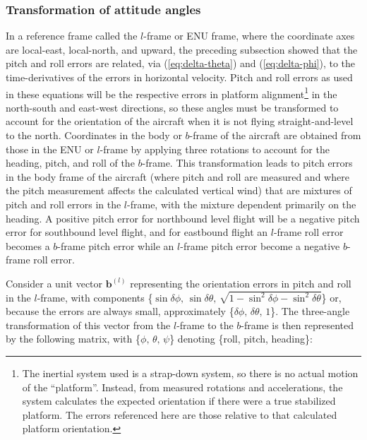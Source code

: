 \documentclass[12pt,twoside,english]{article}\usepackage[]{graphicx}\usepackage[]{color}
\let\OrgIndex\index
\renewcommand*{\index}[1]{\OrgIndex{#1}}
\begin{document}
\subsubsection{Transformation of attitude angles\label{sub:angle-transforms-for-pitch-correction}}

In a reference frame called the $l$-frame or ENU frame, where the coordinate axes are local-east, local-north, and upward, the preceding subsection showed that the pitch and roll errors are related, via (\ref{eq:delta-theta}) and (\ref{eq:delta-phi}), to the time-derivatives of the errors in horizontal velocity. Pitch and roll errors as used in these equations will be the respective errors in platform alignment\footnote{The inertial system used is a strap-down system, so there is no actual motion of the ``platform''. Instead, from measured rotations and accelerations, the system calculates the expected orientation if there were a true stabilized platform. The errors referenced here are those relative to that calculated platform orientation.} in the north-south and east-west directions, so these angles must be transformed to account for the orientation of the aircraft when it is not flying straight-and-level to the north. Coordinates in the body or $b$-frame of the aircraft are obtained from those in the ENU or $l$-frame by applying three rotations to account for the heading, pitch, and roll of the $b$-frame. This transformation leads to pitch errors in the body frame of the aircraft (where pitch and roll are measured and where the pitch measurement affects the calculated vertical wind) that are mixtures of pitch and roll errors in the $l$-frame, with the mixture dependent primarily on the heading. A positive pitch error for northbound level flight will be a negative pitch error for southbound level flight, and for eastbound flight an $l$-frame roll error becomes a $b$-frame pitch error while an $l$-frame pitch error become a negative $b$-frame roll error. 

Consider a unit vector $\mathbf{b}^{(l)}$ representing the orientation errors in pitch and roll in the $l$-frame, with components \{$\sin\delta\phi,\,\sin\delta\theta,\,\sqrt{1-\sin^{2}\delta\phi-\sin^{2}\delta\theta}$\} or, because the errors are always small, approximately \{$\delta\phi,\,\delta\theta,\,1$\}. The three-angle transformation of this vector from the $l$-frame to the $b$-frame is then represented by the following matrix, with 
\{$\phi,\,\theta,\,\psi$\} denoting \{roll, pitch, heading\}:
\end{document}
